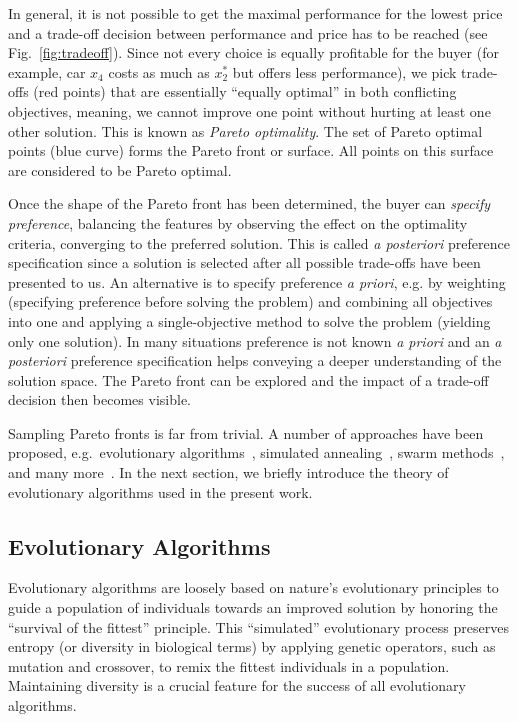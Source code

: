 \documentclass[%
preprint,
preprint,
linenumbers,
amsmath,amssymb,
aps,
prstab,
]{revtex4-1}
\begin{document}
In general, it is not possible to get the maximal performance for the lowest
  price and a trade-off decision between performance and price has to be
  reached (see Fig.~\ref{fig:tradeoff}).
Since not every choice is equally profitable for the buyer (for example, car
  $x_4$ costs as much as $x_2^*$ but offers less performance), we pick
  trade-offs (red points) that are essentially ``equally optimal'' in both
  conflicting objectives, meaning, we cannot improve one point without hurting
  at least one other solution.
This is known as \textit{Pareto optimality}.
The set of Pareto optimal points (blue curve) forms the Pareto front or
  surface.
All points on this surface are considered to be Pareto optimal.

Once the shape of the Pareto front has been determined, the buyer can
  \textit{specify preference}, balancing the features by observing the
  effect on the optimality criteria, converging to the preferred solution.
This is called \textit{a posteriori} preference specification since 
  a solution is selected after all possible trade-offs have been presented to us.
An alternative is to specify preference \textit{a priori}, e.g. by
  weighting (specifying preference before solving the problem) and combining
  all objectives into one and applying a single-objective method to solve the
  problem (yielding only one solution).
In many situations preference is not known \textit{a priori} and an
  \textit{a posteriori} preference specification helps conveying a deeper
  understanding of the solution space.
The Pareto front can be explored and the impact of a trade-off decision then
  becomes visible.

Sampling Pareto fronts is far from trivial.
A number of approaches have been proposed,
  e.g.\ evolutionary algorithms~\cite{deb:09},
  simulated annealing~\cite{kigv:83},
  swarm methods~\cite{keeb:95},
  and many more~\cite{domc:96,cati:02,kara:05,hoss:09}.
In the next section, we briefly introduce the theory of evolutionary algorithms
  used in the present work.


\subsection{Evolutionary Algorithms}

Evolutionary algorithms are loosely based on nature's evolutionary
  principles to guide a population of individuals towards an improved solution
  by honoring the ``survival of the fittest'' principle.
This ``simulated'' evolutionary process preserves entropy (or diversity in
  biological terms) by applying genetic operators, such as mutation and
  crossover, to remix the fittest individuals in a population.
Maintaining diversity is a crucial feature for the success of all evolutionary
  algorithms.
\end{document}
